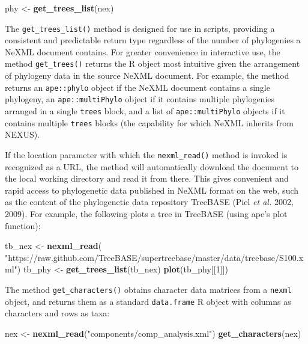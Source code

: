 \documentclass[author-year, review, 11pt]{components/elsarticle} %
\newenvironment{Shaded}{\begin{snugshade}}{\end{snugshade}}
\newcommand{\KeywordTok}[1]{\textcolor[rgb]{0.13,0.29,0.53}{\textbf{{#1}}}}
\newcommand{\DecValTok}[1]{\textcolor[rgb]{0.00,0.00,0.81}{{#1}}}
\newcommand{\StringTok}[1]{\textcolor[rgb]{0.31,0.60,0.02}{{#1}}}
\newcommand{\NormalTok}[1]{{#1}}
\begin{document}
\begin{Shaded}
\begin{Highlighting}[]
\NormalTok{phy <-}\StringTok{ }\KeywordTok{get_trees_list}\NormalTok{(nex)}
\end{Highlighting}
\end{Shaded}

The \texttt{get\_trees\_list()} method is designed for use in scripts,
providing a consistent and predictable return type regardless of the
number of phylogenies a NeXML document contains. For greater convenience
in interactive use, the method \texttt{get\_trees()} returns the R
object most intuitive given the arrangement of phylogeny data in the
source NeXML document. For example, the method returns an
\texttt{ape::phylo} object if the NeXML document contains a single
phylogeny, an \texttt{ape::multiPhylo} object if it contains multiple
phylogenies arranged in a single \texttt{trees} block, and a list of
\texttt{ape::multiPhylo} objects if it contains multiple \texttt{trees}
blocks (the capability for which NeXML inherits from NEXUS).

If the location parameter with which the \texttt{nexml\_read()} method
is invoked is recognized as a URL, the method will automatically
download the document to the local working directory and read it from
there. This gives convenient and rapid access to phylogenetic data
published in NeXML format on the web, such as the content of the
phylogenetic data repository TreeBASE (Piel \emph{et al.} 2002, 2009).
For example, the following plots a tree in TreeBASE (using ape's plot
function):

\begin{Shaded}
\begin{Highlighting}[]
\NormalTok{tb_nex <-}\StringTok{ }\KeywordTok{nexml_read}\NormalTok{(}
\StringTok{"https://raw.github.com/TreeBASE/supertreebase/master/data/treebase/S100.xml"}\NormalTok{)}
\NormalTok{tb_phy <-}\StringTok{ }\KeywordTok{get_trees_list}\NormalTok{(tb_nex)}
\KeywordTok{plot}\NormalTok{(tb_phy[[}\DecValTok{1}\NormalTok{]]) }
\end{Highlighting}
\end{Shaded}

The method \texttt{get\_characters()} obtains character data matrices
from a \texttt{nexml} object, and returns them as a standard
\texttt{data.frame} R object with columns as characters and rows as
taxa:

\begin{Shaded}
\begin{Highlighting}[]
\NormalTok{nex <-}\StringTok{ }\KeywordTok{nexml_read}\NormalTok{(}\StringTok{"components/comp_analysis.xml"}\NormalTok{)}
\KeywordTok{get_characters}\NormalTok{(nex)}
\end{Highlighting}
\end{Shaded}
\end{document}
